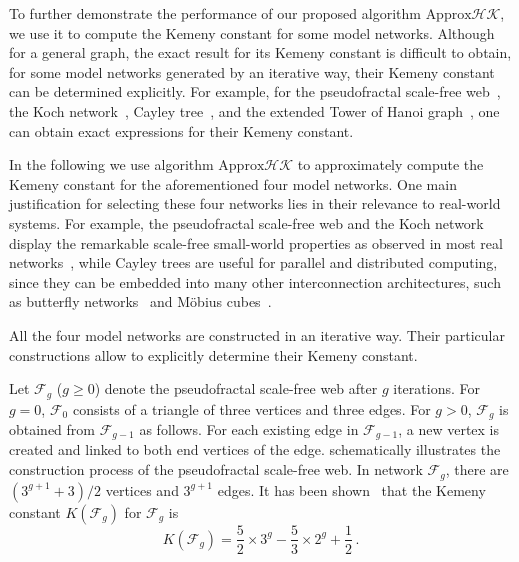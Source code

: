 \documentclass[10pt,twocolumn,twoside]{IEEEtran}
\begin{document}
To further demonstrate the performance of our proposed algorithm \(\text{Approx}\mathcal{HK}\), we use it to compute the Kemeny constant for some model networks.  Although for a general graph, the exact result for its  Kemeny constant is difficult to obtain, for some model networks generated by an iterative way, their Kemeny constant can be determined explicitly.
For example, for the pseudofractal scale-free web~\cite{XiZhCo16}, the Koch network~\cite{XiLiZh15}, Cayley tree~\cite{CaCh97,ChCa99}, and the extended Tower of Hanoi graph~\cite{KlMo05}, one can obtain exact expressions for their Kemeny constant.

In the following we use algorithm \(\text{Approx}\mathcal{HK}\) to approximately compute the Kemeny constant for the aforementioned four model networks. One main justification for selecting  these four networks lies in their relevance to real-world systems. For example,  the pseudofractal scale-free web and the Koch network display the remarkable scale-free small-world properties as observed in most real networks~\cite{Ne03}, while  Cayley trees are useful for parallel and distributed computing, since they can be embedded into many other interconnection architectures, such as butterfly networks~\cite{GuHa91} and M{\"o}bius cubes~\cite{LiFaJi16}.

All the four model networks are constructed in an iterative way. Their particular constructions allow to explicitly determine their Kemeny constant.


Let \(\mathcal{F}_g\) (\(g \geq 0\)) denote the pseudofractal scale-free web after \(g\) iterations. For \(g=0\), \( \mathcal{F}_0\) consists of a triangle of three vertices and three edges. For \(g>0\), \(\mathcal{F}_g\) is obtained from \(\mathcal{F}_{g-1}\) as follows. For each existing edge in \(\mathcal{F}_{g-1}\), a new vertex is created and linked to both end vertices of the edge.   schematically illustrates the construction process of the pseudofractal scale-free web. In network \(\mathcal{F}_g\), there are \((3^{g+1}+3)/2\) vertices and \(3^{g+1}\) edges.  It has been shown~\cite{XiZhCo16} that the Kemeny constant \(K(\mathcal{F}_g) \) for \(\mathcal{F}_g\) is
\begin{equation}\label{Kg01}
    K(\mathcal{F}_g)=\frac{5}{2}\times3^g-\frac{5}{3}\times2^g+\frac{1}{2}\,. %
\end{equation}
\end{document}
